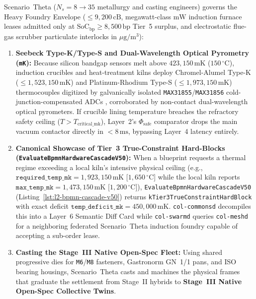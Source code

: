 Scenario~Theta ($N_s = 8 \to 35$ metallurgy and casting engineers) governs the Heavy Foundry Envelope ($\le 9{,}200\,\mathrm{cB}$, megawatt-class $\mathrm{mW}$ induction furnace leases admitted only at $\mathrm{SoC}_{\mathrm{bp}} \ge 8{,}500\,\mathrm{bp}$ Tier~5 surplus, and electrostatic flue-gas scrubber particulate interlocks in $\mu\mathrm{g/m^3}$):
\begin{enumerate}
    \item \textbf{Seebeck Type-K/Type-S and Dual-Wavelength Optical Pyrometry (\texttt{mK}):} Because silicon bandgap sensors melt above $423{,}150\,\mathrm{mK}$ ($150\,^\circ\mathrm{C}$), induction crucibles and heat-treatment kilns deploy Chromel-Alumel Type-K ($\le 1{,}523{,}150\,\mathrm{mK}$) and Platinum-Rhodium Type-S ($\le 1{,}973{,}150\,\mathrm{mK}$) thermocouples digitized by galvanically isolated \texttt{MAX31855}/\texttt{MAX31856} cold-junction-compensated ADCs \parencite{rowe1995crc}, corroborated by non-contact dual-wavelength optical pyrometers. If crucible lining temperature breaches the refractory safety ceiling ($T > T_{\mathrm{critical\_mk}}$), Layer~2's $\Phi_{\mathrm{safe}}$ comparator drops the main vacuum contactor directly in $< 8\,\mathrm{ms}$, bypassing Layer~4 latency entirely.
    \item \textbf{Canonical Showcase of Tier~3 True-Constraint Hard-Blocks (\texttt{EvaluateBpmnHardwareCascadeV50}):} When a blueprint requests a thermal regime exceeding a local kiln's intensive physical ceiling (e.g., $\mathtt{required\_temp\_mk} = 1{,}923{,}150\,\mathrm{mK}$ [$1{,}650\,^\circ\mathrm{C}$] while the local kiln reports $\mathtt{max\_temp\_mk} = 1{,}473{,}150\,\mathrm{mK}$ [$1{,}200\,^\circ\mathrm{C}$]), \texttt{EvaluateBpmnHardwareCascadeV50} (Listing~\ref{lst:l2-bpmn-cascade-v50}) returns \texttt{kTier3TrueConstraintHardBlock} with exact deficit $\mathtt{temp\_deficit\_mk} = 450{,}000\,\mathrm{mK}$. \texttt{col-commonsd} decompiles this into a Layer~6 Semantic Diff Card while \texttt{col-swarmd} queries \texttt{col-meshd} for a neighboring federated Scenario~Theta induction foundry capable of accepting a sub-order lease.
    \item \textbf{Casting the Stage~III Native Open-Spec Fleet:} Using shared progressive dies for \texttt{M6}/\texttt{M8} fasteners, Gastronorm GN~1/1 pans, and ISO bearing housings, Scenario~Theta casts and machines the physical frames that graduate the settlement from Stage~II hybrids to \textbf{Stage~III Native Open-Spec Collective Twins}.
\end{enumerate}

